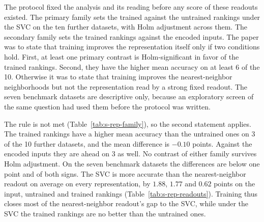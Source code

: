 The protocol fixed the analysis and its reading before any score of these readouts existed. The primary family sets the trained against the untrained rankings under the SVC on the ten further datasets, with Holm adjustment across them. The secondary family sets the trained rankings against the encoded inputs. The paper was to state that training improves the representation itself only if two conditions hold. First, at least one primary contrast is Holm-significant in favor of the trained rankings. Second, they have the higher mean accuracy on at least 6 of the 10. Otherwise it was to state that training improves the nearest-neighbor neighborhoods but not the representation read by a strong fixed readout. The seven benchmark datasets are descriptive only, because an exploratory screen of the same question had used them before the protocol was written.

The rule is not met (Table~\ref{tab:s-rep-family}), so the second statement applies. The trained rankings have a higher mean accuracy than the untrained ones on 3 of the 10 further datasets, and the mean difference is $-0.10$ points. Against the encoded inputs they are ahead on 3 as well. No contrast of either family survives Holm adjustment. On the seven benchmark datasets the differences are below one point and of both signs. The SVC is more accurate than the nearest-neighbor readout on average on every representation, by $1.88$, $1.77$ and $0.62$ points on the input, untrained and trained rankings (Table~\ref{tab:s-rep-readouts}). Training thus closes most of the nearest-neighbor readout's gap to the SVC, while under the SVC the trained rankings are no better than the untrained ones.

\clearpage



